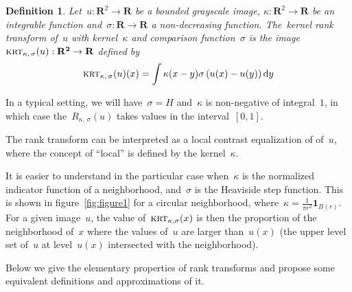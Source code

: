\documentclass[12pt]{article}                  %
\newtheorem{definition}{Definition}
\def\parens#1{\left(#1\right)}
\begin{document}
\begin{definition}\label{def:krt}
Let~$u:\mathbf{R}^2\to\mathbf{R}$ be a bounded grayscale image,
$\kappa:\mathbf{R}^2\to\mathbf{R}$ be an integrable function
and~$\sigma:\mathbf{R}\to\mathbf{R}$ a non-decreasing
function.  The~\emph{kernel rank transform of~$u$ with kernel~$\kappa$ and
comparison function~$\sigma$} is the
image~$\textsc{krt}_{\kappa,\,\sigma}(u):\mathbf{R^2}\to\mathbf{R}$ defined by
\begin{equation}\label{eq:rtdef}
	\textsc{krt}_{\kappa,\,\sigma}(u)(x) = \int\kappa(x-y)\sigma\parens{u(x)-u(y)}\mathrm{d}y
\end{equation}
\end{definition}

In a typical setting, we will have~$\sigma=H$ and~$\kappa$ is non-negative of
integral~$1$, in which
case the~$R_{\kappa,\,\sigma}(u)$ takes values in the
interval~$[0,1]$.



The rank transform can be interpreted as a local contrast equalization of
of~$u$, where the concept of ``local'' is defined by the kernel~$\kappa$.

It is easier to understand in the particular case
when~$\kappa$ %
is the normalized
indicator function of a neighborhood, and~$\sigma$ is the Heaviside step
function.  This is shown in figure~\ref{fig:figure1} for a circular
neighborhood, where~$\kappa=\frac1{\pi r^2}\mathbf{1}_{B(r)}$.
For a given image~$u$,
the value of~$\textsc{krt}_{\kappa,\sigma}(x)$ is then the proportion of the
neighborhood of~$x$ where the values of~$u$ are larger than~$u(x)$ (the
upper level set of~$u$ at level~$u(x)$ intersected with the neighborhood).



Below we give the elementary properties of rank transforms and propose some
equivalent definitions and approximations of it.
\end{document}

